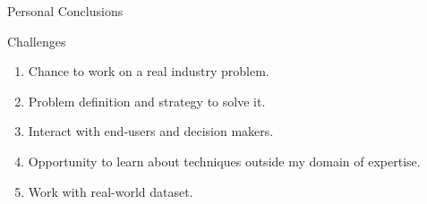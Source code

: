 
\begin{frame}{Personal Conclusions}
   \begin{alertblock}{Challenges}
       \begin{enumerate}
           \item Chance to work on a real industry problem.
           \item Problem definition and strategy to solve it.
           \item Interact with end-users and decision makers.
           \item Opportunity to learn about techniques outside my domain of expertise.
           \item Work with real-world dataset.
       \end{enumerate}
   \end{alertblock}
\end{frame}